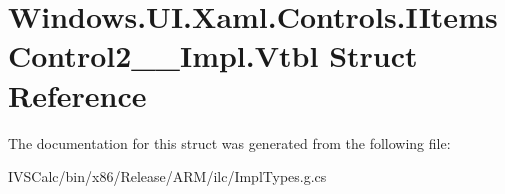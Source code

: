\hypertarget{struct_windows_1_1_u_i_1_1_xaml_1_1_controls_1_1_i_items_control2_____impl_1_1_vtbl}{}\section{Windows.\+U\+I.\+Xaml.\+Controls.\+I\+Items\+Control2\+\_\+\+\_\+\+Impl.\+Vtbl Struct Reference}
\label{struct_windows_1_1_u_i_1_1_xaml_1_1_controls_1_1_i_items_control2_____impl_1_1_vtbl}


The documentation for this struct was generated from the following file\+:\begin{DoxyCompactItemize}
\item 
I\+V\+S\+Calc/bin/x86/\+Release/\+A\+R\+M/ilc/Impl\+Types.\+g.\+cs\end{DoxyCompactItemize}

